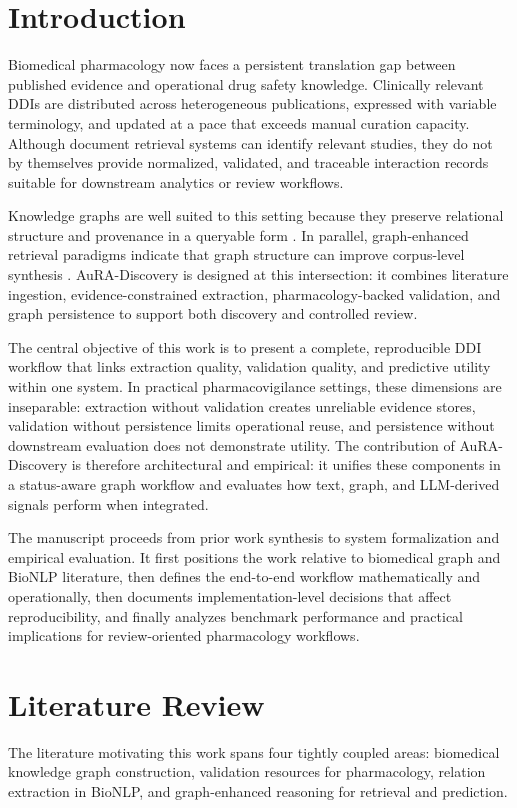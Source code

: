 \documentclass[conference]{Template/IEEEtran}
\begin{document}
\section{Introduction}
Biomedical pharmacology now faces a persistent translation gap between published evidence and operational drug safety knowledge. Clinically relevant DDIs are distributed across heterogeneous publications, expressed with variable terminology, and updated at a pace that exceeds manual curation capacity. Although document retrieval systems can identify relevant studies, they do not by themselves provide normalized, validated, and traceable interaction records suitable for downstream analytics or review workflows.

Knowledge graphs are well suited to this setting because they preserve relational structure and provenance in a queryable form \cite{hansel2023kg,lu2025bkgsurvey}. In parallel, graph-enhanced retrieval paradigms indicate that graph structure can improve corpus-level synthesis \cite{edge2024graphrag,peng2025graphragsurvey}. AuRA-Discovery is designed at this intersection: it combines literature ingestion, evidence-constrained extraction, pharmacology-backed validation, and graph persistence to support both discovery and controlled review.

The central objective of this work is to present a complete, reproducible DDI workflow that links extraction quality, validation quality, and predictive utility within one system. In practical pharmacovigilance settings, these dimensions are inseparable: extraction without validation creates unreliable evidence stores, validation without persistence limits operational reuse, and persistence without downstream evaluation does not demonstrate utility. The contribution of AuRA-Discovery is therefore architectural and empirical: it unifies these components in a status-aware graph workflow and evaluates how text, graph, and LLM-derived signals perform when integrated.

The manuscript proceeds from prior work synthesis to system formalization and empirical evaluation. It first positions the work relative to biomedical graph and BioNLP literature, then defines the end-to-end workflow mathematically and operationally, then documents implementation-level decisions that affect reproducibility, and finally analyzes benchmark performance and practical implications for review-oriented pharmacology workflows.

\section{Literature Review}
The literature motivating this work spans four tightly coupled areas: biomedical knowledge graph construction, validation resources for pharmacology, relation extraction in BioNLP, and graph-enhanced reasoning for retrieval and prediction.
\end{document}

